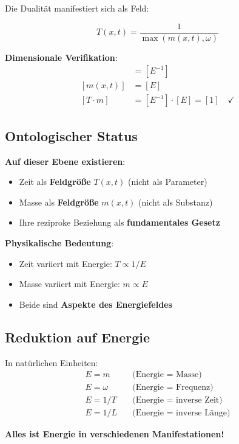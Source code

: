 Die Dualität manifestiert sich als Feld:

\begin{equation}
\boxed{T(x,t) = \frac{1}{\max(m(x,t), \omega)}}
\end{equation}

\textbf{Dimensionale Verifikation}:
\begin{align}
[T(x,t)] &= [E^{-1}] \\
[m(x,t)] &= [E] \\
[T \cdot m] &= [E^{-1}] \cdot [E] = [1] \quad \checkmark
\end{align}

\subsection{Ontologischer Status}

\textbf{Auf dieser Ebene existieren}:
\begin{itemize}
\item Zeit als \textbf{Feldgröße} $T(x,t)$ (nicht als Parameter)
\item Masse als \textbf{Feldgröße} $m(x,t)$ (nicht als Substanz)
\item Ihre reziproke Beziehung als \textbf{fundamentales Gesetz}
\end{itemize}

\textbf{Physikalische Bedeutung}:
\begin{itemize}
\item Zeit variiert mit Energie: $T \propto 1/E$
\item Masse variiert mit Energie: $m \propto E$
\item Beide sind \textbf{Aspekte des Energiefeldes}
\end{itemize}

\subsection{Reduktion auf Energie}

In natürlichen Einheiten:
\begin{align}
E = m \quad &\text{(Energie = Masse)} \\
E = \omega \quad &\text{(Energie = Frequenz)} \\
E = 1/T \quad &\text{(Energie = inverse Zeit)} \\
E = 1/L \quad &\text{(Energie = inverse Länge)}
\end{align}

\textbf{Alles ist Energie in verschiedenen Manifestationen!}

